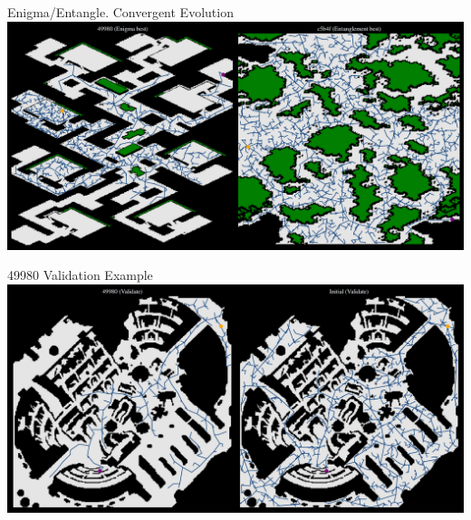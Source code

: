 \documentclass[aspectratio=169]{beamer}
\begin{document}
\begin{frame}{Enigma/Entangle. Convergent Evolution}
    \centering
    \vspace{-0.1}
    \includegraphics[width=1.0\linewidth, keepaspectratio]{figures/learned_split_1.pdf}
\end{frame}

\begin{frame}{49980 Validation Example}
    \includegraphics[width=1.0\linewidth, keepaspectratio]{figures/learned_split_2.pdf}
\end{frame}
\end{document}

